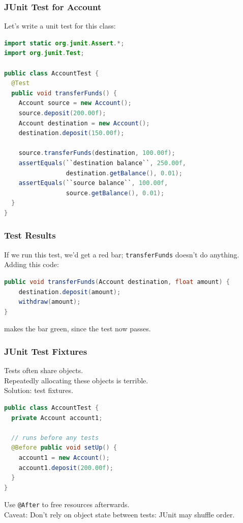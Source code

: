 \begin{frame}[fragile]
\frametitle{JUnit Test for Account}
Let's write a unit test for this class:

\begin{lstlisting}[language={Java},basicstyle=\scriptsize]
import static org.junit.Assert.*;
import org.junit.Test;

public class AccountTest {
  @Test
  public void transferFunds() {
    Account source = new Account();
    source.deposit(200.00f);
    Account destination = new Account();
    destination.deposit(150.00f);

    source.transferFunds(destination, 100.00f);
    assertEquals(``destination balance``, 250.00f, 
                 destination.getBalance(), 0.01);
    assertEquals(``source balance``, 100.00f, 
                 source.getBalance(), 0.01);
  }
}
\end{lstlisting}
\end{frame}

\begin{frame}[fragile]
\frametitle{Test Results}

\begin{changemargin}{1.5cm}
If we run this test, we'd get a red bar; {\tt transferFunds} doesn't
do anything. Adding this code:

\begin{lstlisting}[language={Java},basicstyle=\scriptsize]
public void transferFunds(Account destination, float amount) {
    destination.deposit(amount);
    withdraw(amount);
}
\end{lstlisting}
makes the bar green, since the test now passes.
\end{changemargin}
\end{frame}

\begin{frame}[fragile]
\frametitle{JUnit Test Fixtures}

\begin{changemargin}{1cm}
Tests often share objects.\\[1em]

Repeatedly allocating these objects is terrible.\\[1em]

Solution: test fixtures.

\begin{lstlisting}[language={Java},basicstyle=\scriptsize]
public class AccountTest {
  private Account account1;

  // runs before any tests
  @Before public void setUp() {
    account1 = new Account(); 
    account1.deposit(200.00f);
  }
}
\end{lstlisting}

Use {\tt @After} to free resources afterwards.\\[1em]

\alert{Caveat:} Don't rely on object state between tests: JUnit may shuffle order.
\end{changemargin}
\end{frame}

